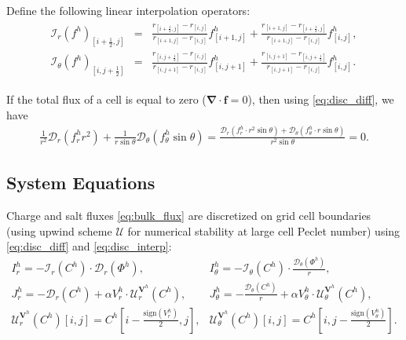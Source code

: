 \documentclass[10pt]{ijnam}
\newcommand{\sign}{\ensuremath{\mathrm{sign}}}
\newcommand{\pars}[1]{\left(#1\right)}
\newcommand{\half}{\frac{1}{2}}
\newcommand\bnabla{\boldsymbol{\nabla}}
\newcommand\bV{\boldsymbol{V}}
\newcommand\cI{\mathcal{I}}
\newcommand\cD{\mathcal{D}}
\begin{document}
Define the following linear interpolation operators:
\begin{eqnarray} \label{eq:disc_interp}
\begin{array}{rcl}
\cI_r(f^h)_{\left[i+\half,j\right]} &=& 
\frac{r_{\left[i+\half,j\right]} - r_{\left[i,j\right]}}
{r_{\left[i+1,j\right]} - r_{\left[i,j\right]}} 
f^h_{\left[i+1,j\right]} 
+ 
\frac{r_{\left[i+1,j\right]} - r_{\left[i+\half,j\right]}}
{r_{\left[i+1,j\right]} - r_{\left[i,j\right]}}
f^h_{\left[i,j\right]},
\\
\cI_\theta(f^h)_{\left[i,j+\half\right]} &=& 
\frac{r_{\left[i,j+\half\right]} - r_{\left[i,j\right]}}
{r_{\left[i,j+1\right]} - r_{\left[i,j\right]}}
  f^h_{\left[i,j+1\right]} + 
\frac{ r_{\left[i,j+1\right]} - r_{\left[i,j+\half\right]}}
{r_{\left[i,j+1\right]} - r_{\left[i,j\right]}}
  f^h_{\left[i,j\right]}.
\end{array}
\end{eqnarray}

If the total flux of a cell is equal to zero ($\bnabla \cdot \boldsymbol{f} = 0$), 
then using \eqref{eq:disc_diff}, we have
\begin{eqnarray}
\frac{1}{r^2} \cD_r\pars{f^h_r r^2} + 
\frac{1}{r \sin\theta} \cD_\theta\pars{f^h_\theta \sin\theta} =
\frac{\cD_r\pars{f^h_r \cdot r^2 \sin\theta} + 
\cD_\theta\pars{f^h_\theta \cdot r \sin\theta}}{r^2 \sin\theta} = 0. 
\end{eqnarray}

\subsection{System Equations} \label{sec:disc_equations}
Charge and salt fluxes \eqref{eq:bulk_flux} are discretized on grid cell boundaries 
(using upwind scheme $\mathcal{U}$ for numerical stability at large cell Peclet number)  
using \eqref{eq:disc_diff} and \eqref{eq:disc_interp}:
\begin{eqnarray} \nonumber
I^h_r = -\cI_r(C^h) \cdot \cD_r(\varPhi^h), &
I^h_\theta = -\cI_\theta(C^h) \cdot \frac{\cD_\theta(\varPhi^h)}{r}, \\
J^h_r = -\cD_r(C^h) + \alpha V^h_r \cdot \mathcal{U}^{\bV^h}_r (C^h), &
J^h_\theta = -\frac{\cD_\theta(C^h)}{r} + \alpha V^h_\theta \cdot \mathcal{U}^{\bV^h}_\theta (C^h), 
\\ \nonumber
 \mathcal{U}^{\bV^h}_r(C^h)[i,j] = C^h\left[i-\frac{\sign(V^h_r)}{2}, j\right], &
 \mathcal{U}^{\bV^h}_\theta(C^h)[i,j] = C^h\left[i, j-\frac{\sign(V^h_\theta)}{2}\right]. 
\end{eqnarray}
\end{document}
